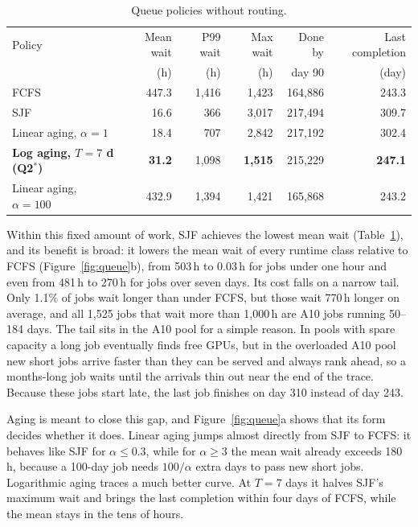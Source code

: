 \documentclass[11pt,a4paper]{article}
\newcommand{\Qstar}{Q2$^{*}$}
\begin{document}
\begin{table}[ht]
\centering\small
\caption{Queue policies without routing.}\label{tab:policies}
\begin{tabular}{lrrrrr}
\toprule
Policy & Mean wait & P99 wait & Max wait & Done by & Last completion\\
 & (h) & (h) & (h) & day 90 & (day)\\
\midrule
FCFS & 447.3 & 1,416 & 1,423 & 164,886 & 243.3\\
SJF & 16.6 & 366 & 3,017 & 217,494 & 309.7\\
Linear aging, $\alpha=1$ & 18.4 & 707 & 2,842 & 217,192 & 302.4\\
\textbf{Log aging, $T=7$ d (\Qstar)} & \textbf{31.2} & 1,098 & \textbf{1,515} & 215,229 & \textbf{247.1}\\
Linear aging, $\alpha=100$ & 432.9 & 1,394 & 1,421 & 165,868 & 243.2\\
\bottomrule
\end{tabular}
\end{table}

Within this fixed amount of work, SJF achieves the lowest mean wait (Table~\ref{tab:policies}), and its benefit is broad: it lowers the mean wait of every runtime class relative to FCFS (Figure~\ref{fig:queue}b), from 503\,h to 0.03\,h for jobs under one hour and even from 481\,h to 270\,h for jobs over seven days. Its cost falls on a narrow tail. Only 1.1\% of jobs wait longer than under FCFS, but those wait 770\,h longer on average, and all 1,525 jobs that wait more than 1,000\,h are A10 jobs running 50--184 days. The tail sits in the A10 pool for a simple reason. In pools with spare capacity a long job eventually finds free GPUs, but in the overloaded A10 pool new short jobs arrive faster than they can be served and always rank ahead, so a months-long job waits until the arrivals thin out near the end of the trace. Because these jobs start late, the last job finishes on day 310 instead of day 243.

Aging is meant to close this gap, and Figure~\ref{fig:queue}a shows that its form decides whether it does. Linear aging jumps almost directly from SJF to FCFS: it behaves like SJF for $\alpha\le0.3$, while for $\alpha\ge3$ the mean wait already exceeds 180\,h, because a 100-day job needs $100/\alpha$ extra days to pass new short jobs. Logarithmic aging traces a much better curve. At $T=7$ days it halves SJF's maximum wait and brings the last completion within four days of FCFS, while the mean stays in the tens of hours.
\end{document}
